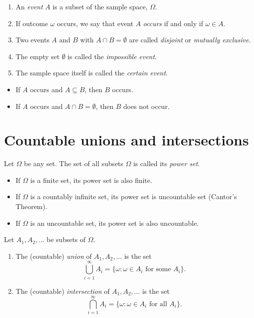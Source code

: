 \break %

\begin{definition}
\begin{enumerate}
\item An \emph{event} $A$ is a subset of the sample space, $\Omega$. 
\item If outcome $\omega$ occurs, we say that event $A$ \emph{occurs} if and only if $\omega\in A$.
\item Two events $A$ and $B$ with $A\cap B=\emptyset$ are called \emph{disjoint} or \emph{mutually exclusive}.
\item The empty set $\emptyset$ is called the \emph{impossible event}.
\item The sample space itself is called the \emph{certain event}.
\end{enumerate}
\end{definition}

\begin{remark}
\begin{itemize}
\item If $A$ occurs and $A\subseteq B$, then $B$ occurs.
\item If $A$ occurs and $A\cap B=\emptyset$, then $B$ does not occur. 
\end{itemize}
\end{remark}

\section{Countable unions and intersections}

\begin{definition}
Let $\Omega$ be any set. The set of all subsets $\Omega$ is called its \emph{power set}.
\end{definition}

\begin{itemize}
\item If $\Omega$ is a finite set, its power set is also finite.
\item If $\Omega$ is a countably infinite set, its power set is uncountable set (Cantor's Theorem).
\item If $\Omega$ is an uncountable set, its power set is also uncountable.
\end{itemize}


\begin{definition}
Let $A_1,A_2,\ldots$ be subsets of $\Omega$.
\begin{enumerate}
\item The (countable) \emph{union} of $A_1,A_2,\ldots$ is the set 
$$\displaystyle\bigcup_{i=1}^\infty A_i = \{\omega:\omega\in A_i \text{ for some }A_i\}.$$
\item The (countable) \emph{intersection} of $A_1,A_2,\ldots$ is the set
$$\displaystyle\bigcap_{i=1}^\infty A_i = \{\omega:\omega\in A_i \text{ for all } A_i\}.$$
\end{enumerate}
\end{definition}

